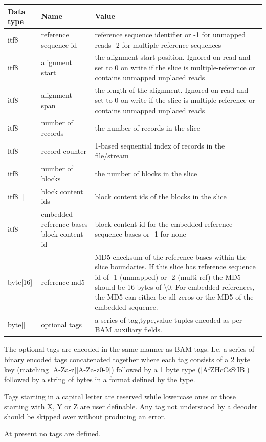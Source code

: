 \documentclass[a4paper]{article}
\begin{document}
\begin{tabular}{|l|l|>{\raggedright}p{200pt}|}
\hline
\textbf{Data type} & \textbf{Name} & \textbf{Value}\tabularnewline
\hline
itf8 & reference sequence id & reference sequence identifier or\linebreak{}
-1 for unmapped reads\linebreak{}
-2 for multiple reference sequences\tabularnewline
\hline
itf8 & alignment start & the alignment start position.\linebreak{}
Ignored on read and set to 0 on write if the slice is multiple-reference
or contains unmapped unplaced reads\tabularnewline
\hline
itf8 & alignment span & the length of the alignment.\linebreak{}
Ignored on read and set to 0 on write if the slice is multiple-reference
or contains unmapped unplaced reads\tabularnewline
\hline
itf8 & number of records & the number of records in the slice\tabularnewline
\hline
ltf8 & record counter & 1-based sequential index of records in the file/stream\tabularnewline
\hline
itf8 & number of blocks & the number of blocks in the slice\tabularnewline
\hline
itf8[ ] & block content ids & block content ids of the blocks in the slice\tabularnewline
\hline
itf8 & embedded reference bases block content id & block content id for the embedded 
reference sequence bases or -1 for none\tabularnewline
\hline
byte[16] & reference md5 & MD5 checksum of the reference bases within the slice 
boundaries.  If this slice has reference sequence id of -1 (unmapped) or -2 (multi-ref)
the MD5 should be 16 bytes of \textbackslash{}0. For embedded references, the MD5
can either be all-zeros or the MD5 of the embedded sequence.\tabularnewline
\hline
byte[] & optional tags & a series of tag,type,value tuples encoded as
per BAM auxiliary fields.\tabularnewline
\hline
\end{tabular}

The optional tags are encoded in the same manner as BAM tags.  I.e. a
series of binary encoded tags concatenated together where each tag
consists of a 2 byte key (matching [A-Za-z][A-Za-z0-9]) followed by a
1 byte type ([AfZHcCsSiIB]) followed by a string of bytes in a format
defined by the type.

Tags starting in a capital letter are reserved while lowercase ones or
those starting with X, Y or Z are user definable.  Any tag not
understood by a decoder should be skipped over without producing an
error.

At present no tags are defined.
\end{document}
